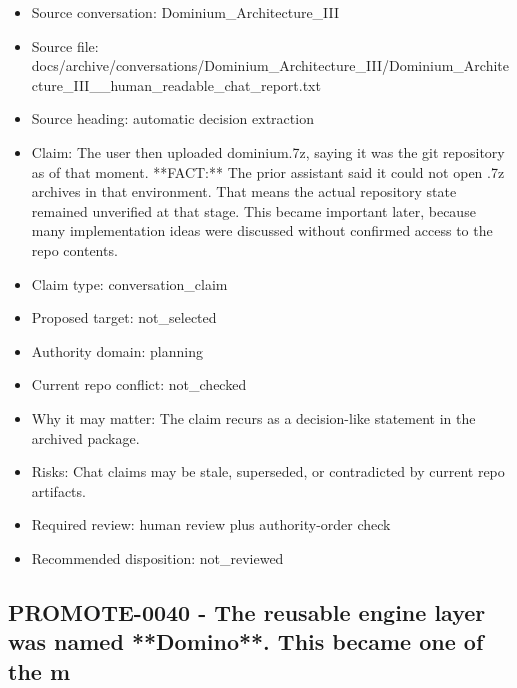 \documentclass[11pt,a4paper]{report}
\begin{document}
\begin{itemize}
\item Source conversation: Dominium\_Architecture\_III
\item Source file: docs/archive/conversations/Dominium\_Architecture\_III/Dominium\_Architecture\_III\_\_human\_readable\_chat\_report.txt
\item Source heading: automatic decision extraction
\item Claim: The user then uploaded dominium.7z, saying it was the git repository as of that moment. **FACT:** The prior assistant said it could not open .7z archives in that environment. That means the actual repository state remained unverified at that stage. This became important later, because many implementation ideas were discussed without confirmed access to the repo contents.
\item Claim type: conversation\_claim
\item Proposed target: not\_selected
\item Authority domain: planning
\item Current repo conflict: not\_checked
\item Why it may matter: The claim recurs as a decision-like statement in the archived package.
\item Risks: Chat claims may be stale, superseded, or contradicted by current repo artifacts.
\item Required review: human review plus authority-order check
\item Recommended disposition: not\_reviewed
\end{itemize}

\subsection{PROMOTE-0040 - The reusable engine layer was named **Domino**. This became one of the m}
\end{document}
